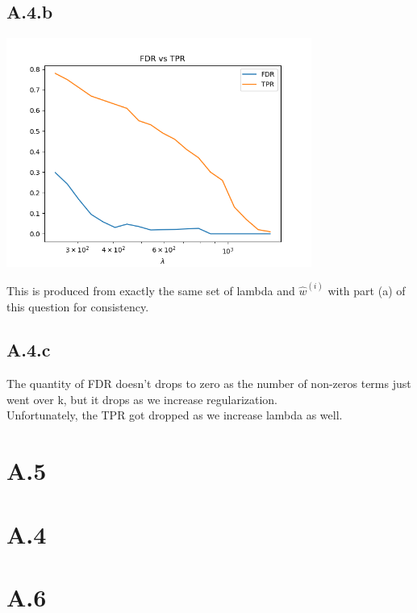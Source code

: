 \documentclass[]{article}
\begin{document}
    \subsection*{A.4.b}
        \begin{center}
            \includegraphics[width=10cm]{A4b-plot.png}
        \end{center}
        This is produced from exactly the same set of lambda and $\hat{w}^{(i)}$ with part (a) of this question for consistency. 
    \subsection*{A.4.c}
        The quantity of FDR doesn't drops to zero as the number of non-zeros terms just went over k, but it drops as we increase regularization. 
        \\
        Unfortunately, the TPR got dropped as we increase lambda as well. 
        

\section*{A.5}
\section*{A.4}
    
\section*{A.6}
    
\end{document}

